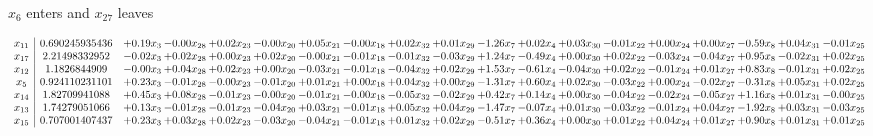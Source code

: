 \documentclass[9pt]{article}
\begin{document}
 $ x_{6} $ enters and $ x_{27} $ leaves 

 \[\begin{array}{c| c c@{\hskip 2pt} c@{\hskip 2pt} c@{\hskip 2pt} c@{\hskip 2pt} c@{\hskip 2pt} c@{\hskip 2pt} c@{\hskip 2pt} c@{\hskip 2pt} c@{\hskip 2pt} c@{\hskip 2pt} c@{\hskip 2pt} c@{\hskip 2pt} c@{\hskip 2pt} c@{\hskip 2pt} c@{\hskip 2pt} c@{\hskip 2pt} c@{\hskip 2pt} }
 x_{11}   &  0.690245935436 & +  0.19 x_{3} & -0.00 x_{28} & +  0.02 x_{23} & -0.00 x_{20} & +  0.05 x_{21} & -0.00 x_{18} & +  0.02 x_{32} & +  0.01 x_{29} & -1.26 x_{7} & +  0.02 x_{4} & +  0.03 x_{30} & -0.01 x_{22} & +  0.00 x_{24} & +  0.00 x_{27} & -0.59 x_{8} & +  0.04 x_{31} & -0.01 x_{25}\\
 x_{17}   &  2.21498332952 & -0.02 x_{3} & +  0.02 x_{28} & +  0.00 x_{23} & +  0.02 x_{20} & -0.00 x_{21} & -0.01 x_{18} & -0.01 x_{32} & -0.03 x_{29} & +  1.24 x_{7} & -0.49 x_{4} & +  0.00 x_{30} & +  0.02 x_{22} & -0.03 x_{24} & -0.04 x_{27} & +  0.95 x_{8} & -0.02 x_{31} & +  0.02 x_{25}\\
 x_{12}   &  1.1826844909 & -0.00 x_{3} & +  0.04 x_{28} & +  0.02 x_{23} & +  0.00 x_{20} & -0.03 x_{21} & -0.01 x_{18} & -0.04 x_{32} & +  0.02 x_{29} & +  1.53 x_{7} & -0.61 x_{4} & -0.04 x_{30} & +  0.02 x_{22} & -0.01 x_{24} & +  0.01 x_{27} & +  0.83 x_{8} & -0.01 x_{31} & +  0.02 x_{25}\\
 x_{5}   &  0.924110231101 & +  0.23 x_{3} & -0.01 x_{28} & -0.00 x_{23} & -0.01 x_{20} & +  0.01 x_{21} & +  0.00 x_{18} & +  0.04 x_{32} & +  0.00 x_{29} & -1.31 x_{7} & +  0.60 x_{4} & +  0.02 x_{30} & -0.03 x_{22} & +  0.00 x_{24} & -0.02 x_{27} & -0.31 x_{8} & +  0.05 x_{31} & +  0.02 x_{25}\\
 x_{14}   &  1.82709941088 & +  0.45 x_{3} & +  0.08 x_{28} & -0.01 x_{23} & -0.00 x_{20} & -0.01 x_{21} & -0.00 x_{18} & -0.05 x_{32} & -0.02 x_{29} & +  0.42 x_{7} & +  0.14 x_{4} & +  0.00 x_{30} & -0.04 x_{22} & -0.02 x_{24} & -0.05 x_{27} & +  1.16 x_{8} & +  0.01 x_{31} & -0.00 x_{25}\\
 x_{13}   &  1.74279051066 & +  0.13 x_{3} & -0.01 x_{28} & -0.01 x_{23} & -0.04 x_{20} & +  0.03 x_{21} & -0.01 x_{18} & +  0.05 x_{32} & +  0.04 x_{29} & -1.47 x_{7} & -0.07 x_{4} & +  0.01 x_{30} & -0.03 x_{22} & -0.01 x_{24} & +  0.04 x_{27} & -1.92 x_{8} & +  0.03 x_{31} & -0.03 x_{25}\\
 x_{15}   &  0.707001407437 & +  0.23 x_{3} & +  0.03 x_{28} & +  0.02 x_{23} & -0.03 x_{20} & -0.04 x_{21} & -0.01 x_{18} & +  0.01 x_{32} & +  0.02 x_{29} & -0.51 x_{7} & +  0.36 x_{4} & +  0.00 x_{30} & +  0.01 x_{22} & +  0.04 x_{24} & +  0.01 x_{27} & +  0.90 x_{8} & +  0.01 x_{31} & +  0.01 x_{25}\\

\end{array}\]
\end{document}
